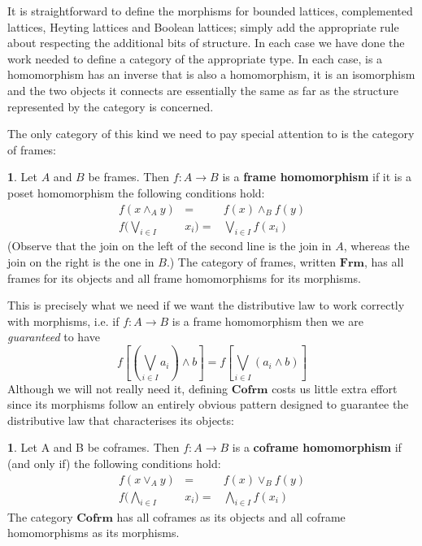 \documentclass[oneside,english]{amsbook}
\numberwithin{section}{chapter}
\theoremstyle{plain}
\theoremstyle{definition}
\newtheorem{defn}[thm]{\protect\definitionname}
\providecommand{\definitionname}{Definition}
\begin{document}
It is straightforward to define the morphisms for bounded lattices, complemented lattices, Heyting lattices and Boolean lattices; simply add the appropriate rule about respecting the additional bits of structure. In each case we have done the work needed to define a category of the appropriate type. In each case, is a homomorphism has an inverse that is also a homomorphism, it is an isomorphism and the two objects it connects are essentially the same as far as the structure represented by the category is concerned.

The only category of this kind we need to pay special attention to is the category of frames: 

\begin{defn} 
	Let $A$ and $B$ be frames. Then $f:A\to B$ is a \textbf{frame homomorphism} if it is a poset homomorphism the following conditions hold:
		\begin{eqnarray*} 
			f(x\land_{A}y) & = & f(x)\land_{B}f(y)\\ 
			f(\bigvee_{i\in I} & x_{i})= & \bigvee_{i\in I}f(x_{i}) 
		\end{eqnarray*}
	(Observe that the join on the left of the second line is the join in $A$, whereas the join on the right is the one in $B$.) The category of frames, written \textbf{$\mathbf{Frm}$}, has all frames for its objects and all frame homomorphisms for its morphisms. 
\end{defn} 

This is precisely what we need if we want the distributive law to work correctly with morphisms, i.e. if $f:A\to B$ is a frame homomorphism then we are \emph{guaranteed }to have
\[ 
	f[(\bigvee_{i\in I}a_{i})\land b]=f[\bigvee_{i\in I}(a_{i}\land b)] 
\] 
Although we will not really need it, defining \textbf{$\mathbf{Cofrm}$} costs us little extra effort since its morphisms follow an entirely obvious pattern designed to guarantee the distributive law that characterises its objects:
 
\begin{defn} 
	Let A and B be coframes. Then $f:A\to B$ is a \textbf{coframe homomorphism} if (and only if) the following conditions hold:
		\begin{eqnarray*} 
			f(x\lor_{A}y) & = & f(x)\lor_{B}f(y)\\
			f(\bigwedge_{i\in I} & x_{i})= & \bigwedge_{i\in I}f(x_{i}) 
		\end{eqnarray*}
The category \textbf{$\mathbf{Cofrm}$} has all coframes as its objects and all coframe homomorphisms as its morphisms.  
\end{defn} 
\end{document}

